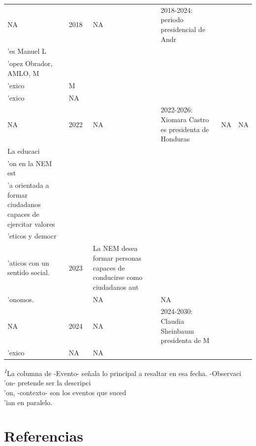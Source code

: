 \documentclass[
  letterpaper,
  DIV=11,
  numbers=noendperiod]{scrreprt}
\begin{document}
\begin{table}
\begin{tabular*}{\linewidth}{@{\extracolsep{\fill}}lllllc}
NA & 2018 & NA & 2018-2024: periodo presidencial de Andr\\'es Manuel L\\'opez Obrador, AMLO, M\\'exico & M\\'exico & NA \\ 
NA & 2022 & NA & 2022-2026: Xiomara Castro es presidenta de Honduras & NA & NA \\ 
La educaci\\'on en la NEM est\\'a orientada a formar ciudadanos capaces de ejercitar valores \\'eticos y democr\\'aticos con un sentido social.  & 2023  & La NEM desea formar personas capaces de conducirse como ciudadanos aut\\'onomos.  &   & NA & NA \\ 
NA & 2024 & NA & 2024-2030: Claudia Sheinbaum presidenta de M\\'exico & NA & NA \\ 
\bottomrule
\end{tabular*}
\begin{minipage}{\linewidth}
\textsuperscript{\textit{1}}La columna de -Evento- se\~nala lo principal a resaltar en esa fecha. -Observaci\\'on- pretende ser la descripci\\'on, -contexto- son los eventos que suced\\'ian en paralelo. \\
\end{minipage}
\end{table}


\chapter*{Referencias}\label{referencias}

\end{document}
